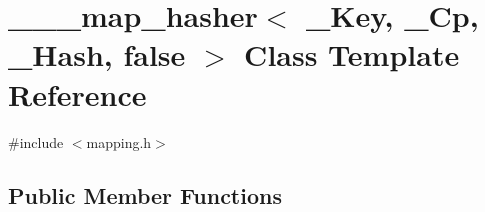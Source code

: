\hypertarget{class______map__hasher_3_01___key_00_01___cp_00_01___hash_00_01false_01_4}{}\section{\+\_\+\+\_\+\+\_\+map\+\_\+hasher$<$ \+\_\+\+Key, \+\_\+\+Cp, \+\_\+\+Hash, false $>$ Class Template Reference}
\label{class______map__hasher_3_01___key_00_01___cp_00_01___hash_00_01false_01_4}


{\ttfamily \#include $<$mapping.\+h$>$}

\subsection*{Public Member Functions}
